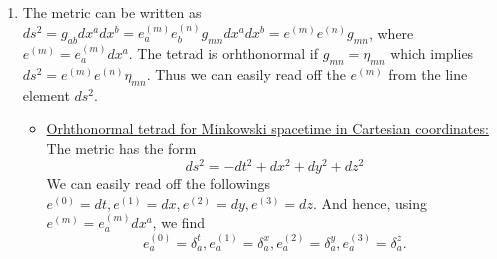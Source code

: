 \documentclass[10pt]{article}
\begin{document}
\begin{enumerate}
\item The metric can be written as $ds^2 = g_{a b}dx^a dx^b = e^{(m)}_a e^{(n)}_b g_{mn}dx^a dx^b = e^{(m)} e^{(n)} g_{mn}$, where $e^{(m)} = e^{(m)}_a dx^a$. The tetrad is orhthonormal if $g_{mn} = \eta_{mn}$ which implies $ds^2 = e^{(m)} e^{(n)} \eta_{mn}$. Thus we can easily read off the $e^{(m)}$ from the line element $ds^2$.
  \begin{itemize}
  \item \underline{Orhthonormal tetrad for Minkowski spacetime in Cartesian coordinates:}
    The metric has the form
    \begin{equation}
      \label{eq:minkowski-cartesian}
      ds^2 = -dt^2 + dx^2 + dy^2 + dz^2
    \end{equation}
    We can easily read off the followings $e^{(0)} = dt, e^{(1)} = dx, e^{(2)} = dy, e^{(3)} = dz$. And hence, using $e^{(m)} = e^{(m)}_a dx^a$, we find
    \begin{equation}
      \label{eq:orthonormal-tetrad-minkowski-cartesian}
      \boxed{e^{(0)}_a = \delta^t_a, e^{(1)}_a = \delta^x_a, e^{(2)}_a = \delta^y_a, e^{(3)}_a = \delta^z_a}.
    \end{equation}


\end{itemize}
\end{enumerate}
\end{document}
